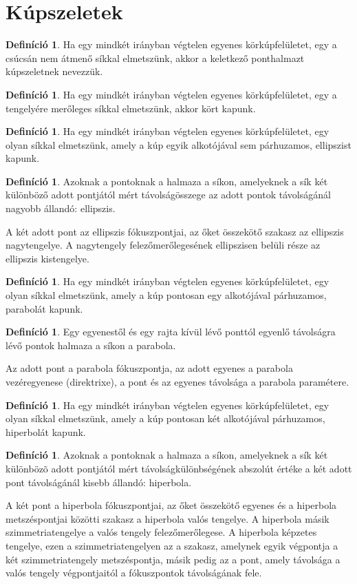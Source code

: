 \documentclass[twoside,12pt]{report}
\theoremstyle{definition}
\newtheorem{definition}[theorem]{Definíció}
\begin{document}
\section{Kúpszeletek}
	\begin{definition}
		Ha egy mindkét irányban végtelen egyenes körkúpfelületet, egy a csúcsán nem átmenő síkkal elmetszünk, akkor a keletkező ponthalmazt kúpszeletnek nevezzük.
	\end{definition}
	\begin{definition}
		Ha egy mindkét irányban végtelen egyenes körkúpfelületet, egy a tengelyére merőleges síkkal elmetszünk, akkor kört kapunk.
	\end{definition}
	\begin{definition}
		Ha egy mindkét irányban végtelen egyenes körkúpfelületet, egy olyan síkkal elmetszünk, amely a kúp egyik alkotójával sem párhuzamos, ellipszist kapunk.
	\end{definition}
	\begin{definition}
		Azoknak a pontoknak a halmaza a síkon, amelyeknek a sík két különböző adott pontjától
		mért távolságösszege az adott pontok távolságánál nagyobb állandó: ellipszis.
	\end{definition}
	A két adott pont az ellipszis fókuszpontjai, az őket összekötő szakasz az ellipszis nagytengelye. A nagytengely felezőmerőlegesének ellipszisen belüli része az ellipszis kistengelye.
	\begin{definition}
		Ha egy mindkét irányban végtelen egyenes körkúpfelületet, egy olyan síkkal elmetszünk, amely a kúp pontosan egy alkotójával párhuzamos, parabolát kapunk.
	\end{definition}
	\begin{definition}
		Egy egyenestől és egy rajta kívül lévő ponttól egyenlő távolságra lévő pontok halmaza
		a síkon a parabola.
	\end{definition}
	Az adott pont a parabola fókuszpontja, az adott egyenes a parabola vezéregyenese (direktrixe),
	a pont és az egyenes távolsága a parabola paramétere.
	\begin{definition}
		Ha egy mindkét irányban végtelen egyenes körkúpfelületet, egy olyan síkkal elmetszünk, amely a kúp pontosan két alkotójával párhuzamos, hiperbolát kapunk.
	\end{definition}
	\begin{definition}
		Azoknak a pontoknak a halmaza a síkon, amelyeknek a sík két különbözõ adott pontjától
		mért távolságkülönbségének abszolút értéke a két adott pont távolságánál kisebb állandó:
		hiperbola.
	\end{definition}
	A két pont a hiperbola fókuszpontjai, az őket összekötő egyenes és a hiperbola metszéspontjai közötti szakasz a hiperbola valós tengelye. A hiperbola másik szimmetriatengelye a valós tengely felezőmerőlegese. A hiperbola képzetes tengelye, ezen a szimmetriatengelyen az a szakasz, amelynek egyik végpontja a két szimmetriatengely metszéspontja, másik pedig az a pont, amely távolsága a valós tengely végpontjaitól a fókuszpontok távolságának fele.
\end{document}
